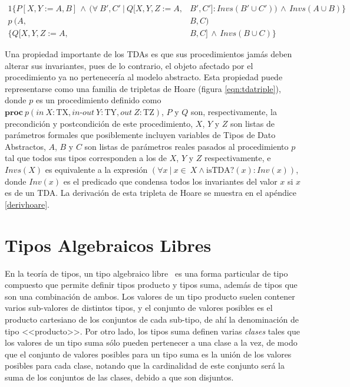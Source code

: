 \begin{alignat}{1}
  \{ P[X,Y:=A,B]\, \land \, (\forall\ B', C'\ |\ Q[X,Y,Z:=A,&B',C'] : Invs(B' \cup C'))\, \land \, Invs(A \cup B)   \} \nonumber \\
  p\  (A,&B,C) \label{eqn:tdatriple} \\ 
  \{ Q[X,Y,Z:=A,&B,C]\, \land \, Invs(B \cup C)\} \nonumber
\end{alignat}

Una propiedad importante de los TDAs es que sus procedimientos jamás deben
alterar sus invariantes, pues de lo contrario, el objeto afectado por el
procedimiento ya no pertenecería al modelo abstracto. Esta propiedad puede
representarse como una familia de tripletas de Hoare (figura
\ref{eqn:tdatriple}), donde $p$ es un procedimiento definido como
$\textbf{proc}\ p (in\ X : \textrm{TX}, in\textrm{-}out\ Y : \textrm{TY}, out\ Z : \textrm{TZ})$, $P$ y $Q$ son, respectivamente, la precondición y postcondición de este procedimiento, $X$, $Y$ y $Z$ son listas de parámetros formales que posiblemente incluyen
variables de Tipos de Dato Abstractos, $A$, $B$ y $C$ son listas de parámetros reales pasados al procedimiento $p$ tal que todos sus tipos corresponden a los de $X$, $Y$ y $Z$ respectivamente, e $Invs(X)$ es equivalente a la expresión $(\forall x\ |\ x \in\ X \land \textrm{isTDA?}(x) : Inv(x) )$, donde $Inv(x)$ es el predicado que condensa todos los
invariantes del valor $x$ si $x$ es de un TDA. La derivación de esta tripleta de Hoare se muestra en el apéndice \ref{derivhoare}.

\section{Tipos Algebraicos Libres}

En la teoría de tipos, un tipo algebraico libre~\cite{ravelotal, foldoc,
lazywithclass} es una forma particular de tipo compuesto que permite definir
tipos producto y tipos suma, además de tipos que son una combinación de ambos.
Los valores de un tipo producto suelen contener varios sub-valores de distintos
tipos, y el conjunto de valores posibles es el producto cartesiano de los
conjuntos de cada sub-tipo, de ahí la denominación de tipo <<producto>>. Por
otro lado, los tipos suma definen varias \textit{clases} tales que  los valores
de un tipo suma sólo pueden pertenecer a una clase a la vez, de modo que el
conjunto de valores posibles para un tipo suma es la unión de los valores
posibles para cada clase, notando que la cardinalidad de este conjunto será la
suma de los conjuntos de las clases, debido a que son disjuntos.

